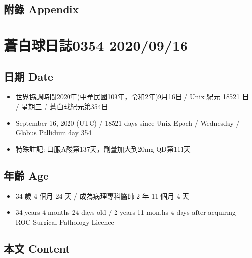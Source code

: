 \documentclass[
]{article}
\providecommand{\tightlist}{%
  \setlength{\itemsep}{0pt}\setlength{\parskip}{0pt}}
\begin{document}
\hypertarget{ux9644ux9304-appendix-14}{%
\subsection{附錄 Appendix}\label{ux9644ux9304-appendix-14}}

\hypertarget{ux84bcux767dux7403ux65e5ux8a8c0354-20200916}{%
\section{蒼白球日誌0354
2020/09/16}\label{ux84bcux767dux7403ux65e5ux8a8c0354-20200916}}

\hypertarget{ux65e5ux671f-date-15}{%
\subsection{日期 Date}\label{ux65e5ux671f-date-15}}

\begin{itemize}
\tightlist
\item
  世界協調時間2020年(中華民國109年，令和2年)9月16日 / Unix 紀元 18521 日
  / 星期三 / 蒼白球紀元第354日
\item
  September 16, 2020 (UTC) / 18521 days since Unix Epoch / Wednesday /
  Globus Pallidum day 354
\item
  特殊註記: 口服A酸第137天，劑量加大到20mg QD第111天
\end{itemize}

\hypertarget{ux5e74ux9f61-age-15}{%
\subsection{年齡 Age}\label{ux5e74ux9f61-age-15}}

\begin{itemize}
\tightlist
\item
  34 歲 4 個月 24 天 / 成為病理專科醫師 2 年 11 個月 4 天
\item
  34 years 4 months 24 days old / 2 years 11 months 4 days after
  acquiring ROC Surgical Pathology Licence
\end{itemize}

\hypertarget{ux672cux6587-content-15}{%
\subsection{本文 Content}\label{ux672cux6587-content-15}}
\end{document}
